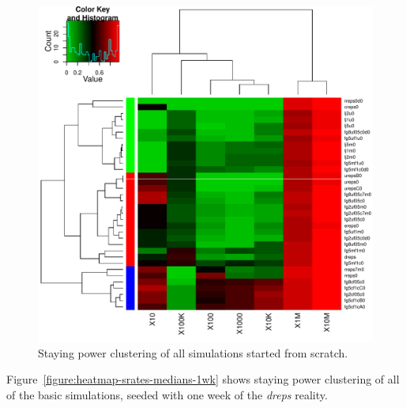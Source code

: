 \documentclass[10pt,oneside]{memoir}
\begin{document}
\begin{figure}
\begin{center}
    \includegraphics{figures/heatmap-srates-medians-0wk}
    \caption{Staying power clustering of all simulations started from scratch.}
    \label{figure:heatmap-srates-medians-0wk}
\end{center}
\end{figure}
Figure~\ref{figure:heatmap-srates-medians-1wk} shows staying power clustering of all of the basic simulations, seeded with one week of the {\itshape dreps} reality.
\end{document}

